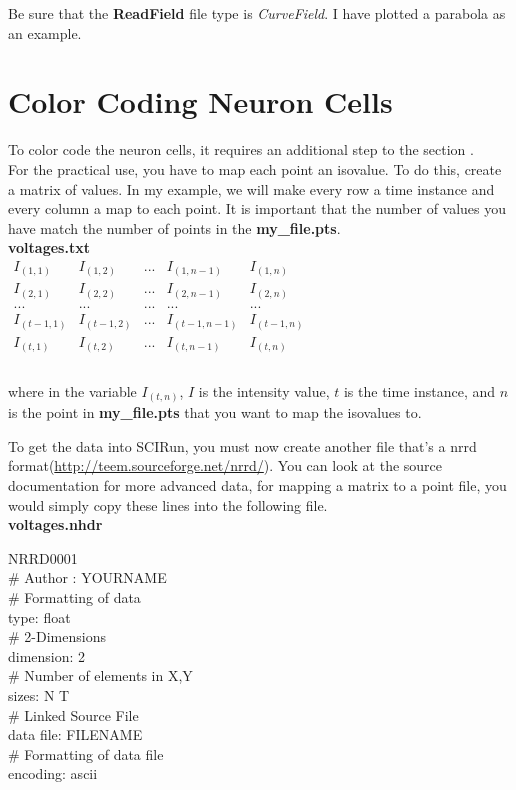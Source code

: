 \documentclass{article}
\begin{document}
Be sure that the \textbf{ReadField} file type is \textit{CurveField}.  I have plotted a parabola as an example.

\section{Color Coding Neuron Cells}

To color code the neuron cells, it requires an additional step to the section .\\

For the practical use, you have to map each point an isovalue.  To do this, create a matrix of values.  In my example, we will make every row a time instance and every column a map to each point.  It is important that the number of values you have match the number of points in the \textbf{my\_file.pts}.\\

\textbf{voltages.txt}\\
\begin{math}
	\begin{array}{lllll}
	I_{(1,1)} & I_{(1,2)} & ... & I_{(1,n-1)} & I_{(1,n)}\\
	I_{(2,1)} & I_{(2,2)} & ... & I_{(2,n-1)} & I_{(2,n)}\\
	... & ... & ... & ... & ...\\
	I_{(t-1,1)} & I_{(t-1,2)} & ... & I_{(t-1,n-1)} & I_{(t-1,n)}\\
	I_{(t,1)} & I_{(t,2)} & ... & I_{(t,n-1)} & I_{(t,n)}\\
	\end{array}
\end{math}\\\\

where in the variable $I_{(t,n)}$, $I$ is the intensity value, $t$ is the time instance, and $n$ is the point in \textbf{my\_file.pts} that you want to map the isovalues to.

To get the data into SCIRun, you must now create another file that's a nrrd format(\url{http://teem.sourceforge.net/nrrd/}).  You can look at the source documentation for more advanced data, for mapping a matrix to a point file, you would simply copy these lines into the following file.\\

\textbf{voltages.nhdr}\\
\begin{itshape}
NRRD0001\\
\# Author : YOURNAME\\
\# Formatting of data\\
type: float\\
\# 2-Dimensions\\
dimension: 2\\
\# Number of elements in X,Y\\
sizes: N T\\
\# Linked Source File\\
data file: FILENAME\\
\# Formatting of data file\\
encoding: ascii
\end{itshape}\\
\end{document}
